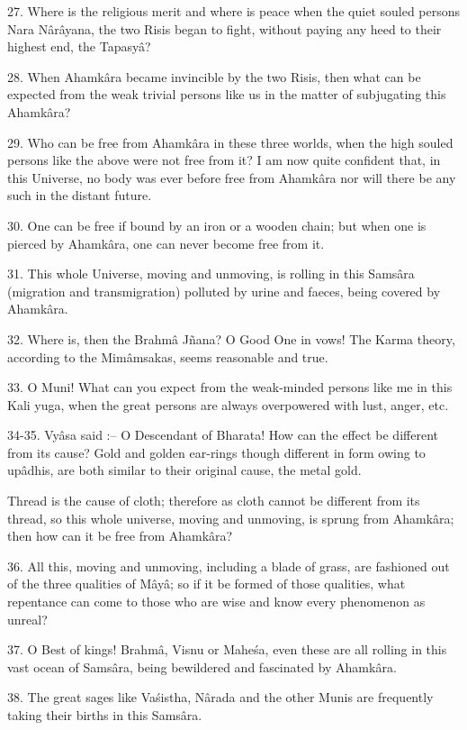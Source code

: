 27. Where is the religious merit and where is peace when the quiet souled persons Nara N\^ar\^ayana, the two Risis began to fight, without paying any heed to their highest end, the Tapasy\^a?

28. When Ahamk\^ara became invincible by the two Risis, then what can be expected from the weak trivial persons like us in the matter of subjugating this Ahamk\^ara?

29. Who can be free from Ahamk\^ara in these three worlds, when the high souled persons like the above were not free from it? I am now quite confident that, in this Universe, no body was ever before free from Ahamk\^ara nor will there be any such in the distant future.

30. One can be free if bound by an iron or a wooden chain; but when one is pierced by Ahamk\^ara, one can never become free from it.

31. This whole Universe, moving and unmoving, is rolling in this Sams\^ara (migration and transmigration) polluted by urine and faeces, being covered by Ahamk\^ara.

32. Where is, then the Brahm\^a Jñana? O Good One in vows! The Karma theory, according to the Mim\^amsakas, seems reasonable and true.

33. O Muni! What can you expect from the weak-minded persons like me in this Kali yuga, when the great persons are always overpowered with lust, anger, etc.

34-35. Vy\^asa said :-- O Descendant of Bharata! How can the effect be different from its cause? Gold and golden ear-rings though different in form owing to up\^adhis, are both similar to their original cause, the metal gold.

Thread is the cause of cloth; therefore as cloth cannot be different from its thread, so this whole universe, moving and unmoving, is sprung from Ahamk\^ara; then how can it be free from Ahamk\^ara?

36. All this, moving and unmoving, including a blade of grass, are fashioned out of the three qualities of M\^ay\^a; so if it be formed of those qualities, what repentance can come to those who are wise and know every phenomenon as unreal?

37. O Best of kings! Brahm\^a, Visnu or Mahe\'sa, even these are all rolling in this vast ocean of Sams\^ara, being bewildered and fascinated by Ahamk\^ara.

38. The great sages like Va\'sistha, N\^arada and the other Munis are frequently taking their births in this Sams\^ara.

